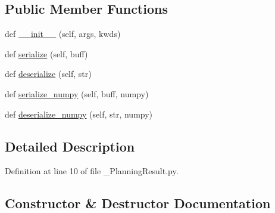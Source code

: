 \subsection*{Public Member Functions}
\begin{DoxyCompactItemize}
\item 
def \hyperlink{classexp__assignment2_1_1msg_1_1__PlanningResult_1_1PlanningResult_a7d913c3178d716bab9a1d5c86f8cb3fd}{\+\_\+\+\_\+init\+\_\+\+\_\+} (self, args, kwds)
\item 
def \hyperlink{classexp__assignment2_1_1msg_1_1__PlanningResult_1_1PlanningResult_adf43a60d7a1613ab494b0f71df222e48}{serialize} (self, buff)
\item 
def \hyperlink{classexp__assignment2_1_1msg_1_1__PlanningResult_1_1PlanningResult_a1cabbb7ce774c8be38e3ac9c49ec76e2}{deserialize} (self, str)
\item 
def \hyperlink{classexp__assignment2_1_1msg_1_1__PlanningResult_1_1PlanningResult_a9158282af54da8e27257ec3ba447c5f2}{serialize\+\_\+numpy} (self, buff, numpy)
\item 
def \hyperlink{classexp__assignment2_1_1msg_1_1__PlanningResult_1_1PlanningResult_abd91bb3a55358633027483832e19771d}{deserialize\+\_\+numpy} (self, str, numpy)
\end{DoxyCompactItemize}


\subsection{Detailed Description}


Definition at line 10 of file \+\_\+\+Planning\+Result.\+py.



\subsection{Constructor \& Destructor Documentation}
\mbox{\label{classexp__assignment2_1_1msg_1_1__PlanningResult_1_1PlanningResult_a7d913c3178d716bab9a1d5c86f8cb3fd}} 
